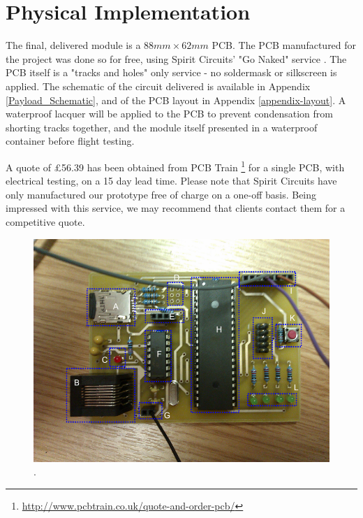 \section{Physical Implementation}
\label{sec:PCB-implementation}

The final, delivered module is a $88mm\times62mm$ PCB. The PCB manufactured 
for the project was done so for free, using Spirit Circuits' "Go Naked"
service \cite{go-naked}. The PCB itself is a "tracks and holes" only service 
- no soldermask or silkscreen is applied. The schematic of the circuit 
delivered is available in Appendix \ref{Payload_Schematic}, and of the PCB layout in Appendix 
\ref{appendix-layout}. A waterproof lacquer will be applied to the PCB to prevent condensation 
from shorting tracks together, and the module itself presented in a 
waterproof container before flight testing.

A quote of \pounds 56.39 has been obtained from PCB Train \footnote{\url{http://www.pcbtrain.co.uk/quote-and-order-pcb/}} 
for a single PCB, with electrical testing, on a 15 day lead time. 
Please note that Spirit Circuits have only manufactured our prototype 
free of charge on a one-off basis. Being impressed with this service, 
we may recommend that clients contact them for a competitive quote.

\begin{figure}[H]
        \centering
        \includegraphics[width=1.00\textwidth]{figures/PayloadImplementation.png}
        . 
        \label{fig:PayloadImplementation}
\end{figure}

